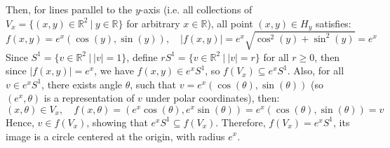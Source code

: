 \documentclass{article}
\begin{document}
\begin{itemize}
    Then, for lines parallel to the $y$-axis (i.e. all collections of $V_x = \{(x,y)\in\mathbb{R}^2\ |\ y\in\mathbb{R}\}$ for arbitrary $x\in \mathbb{R}$), all point $(x,y)\in H_y$ satisfies:
    $$f(x,y)=e^x(\cos(y),\sin(y)),\quad |f(x,y)| = e^x\sqrt{\cos^2(y)+\sin^2(y)}=e^x$$
    Since $S^1 = \{v\in\mathbb{R}^2\ |\ |v|=1\}$, define $rS^1 = \{v\in\mathbb{R}^2\ |\ |v|=r\}$ for all $r\geq 0$, then since $|f(x,y)| = e^x$, we have $f(x,y)\in e^x S^1$, so $f(V_x)\subseteq e^xS^1$.
    Also, for all $v\in e^xS^1$, there exists angle $\theta$, such that $v = e^x(\cos(\theta),\sin(\theta))$ (so $(e^x,\theta)$ is a representation of $v$ under polar coordinates), then:
    $$(x,\theta)\in V_x,\quad f(x,\theta)=(e^x\cos(\theta),e^x\sin(\theta)) = e^x(\cos(\theta),\sin(\theta)) = v$$
    Hence, $v\in f(V_x)$, showing that $e^xS^1\subseteq f(V_x)$. Therefore, $f(V_x)=e^xS^1$, its image is a circle centered at the origin, with radius $e^x$.
\end{itemize}
\end{document}
